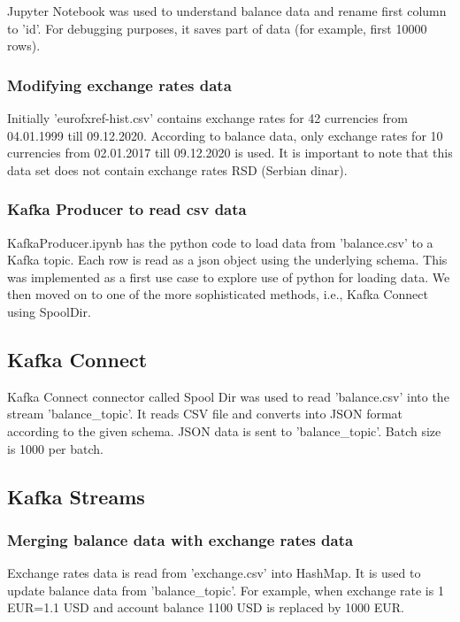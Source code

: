 \documentclass{article}
\begin{document}
Jupyter Notebook was used to understand balance data and rename first column to 'id'. For debugging purposes, it saves part of data (for example, first 10000 rows).

\subsubsection{Modifying exchange rates data}

Initially 'eurofxref-hist.csv' contains exchange rates for 42 currencies from 04.01.1999 till 09.12.2020. According to balance data, only exchange rates for 10 currencies from 02.01.2017 till 09.12.2020 is used. It is important to note that this data set does not contain exchange rates RSD (Serbian dinar).

\subsubsection{Kafka Producer to read csv data}

KafkaProducer.ipynb has the python code to load data from 'balance.csv' to a Kafka topic. Each row is read as a json object using the underlying schema. This was implemented as a first use case to explore use of python for loading data. We then moved on to one of the more sophisticated methods, i.e., Kafka Connect using SpoolDir.

\subsection{Kafka Connect}

Kafka Connect connector called Spool Dir was used to read 'balance.csv' into the stream 'balance\_topic'. It reads CSV file and converts into JSON format according to the given schema. JSON data is sent to 'balance\_topic'. Batch size is 1000 per batch.

\subsection{Kafka Streams}

\subsubsection{Merging balance data with exchange rates data}

Exchange rates data is read from 'exchange.csv' into HashMap. It is used to update balance data from 'balance\_topic'. For example, when exchange rate is 1 EUR=1.1 USD and account balance 1100 USD is replaced by 1000 EUR.
\end{document}
